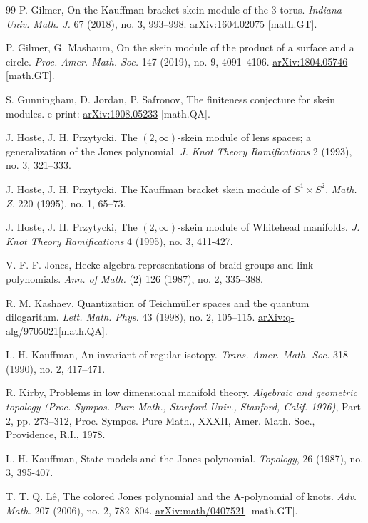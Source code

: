 \documentclass[12pt]{amsproc}
\begin{document}
\begin{thebibliography}{99}
P. Gilmer, On the Kauffman bracket skein module of the $3$-torus.
{\it Indiana Univ. Math. J.} 67 (2018), no. 3, 993–998. \href{https://arxiv.org/abs/1604.02075} {arXiv:1604.02075} [math.GT].

P. Gilmer, G. Masbaum, 
On the skein module of the product of a surface and a circle. {\it Proc. Amer. Math. Soc.} 147 (2019), no. 9, 4091–4106. \href{https://arxiv.org/abs/1804.05746} {arXiv:1804.05746} [math.GT].

S. Gunningham, D. Jordan, P. Safronov, The finiteness conjecture for skein modules. e-print: \href{https://arxiv.org/abs/1908.05233}{arXiv:1908.05233} [math.QA].

J. Hoste, J. H. Przytycki,  The $(2,\infty)$-skein module of lens spaces; a generalization of the Jones polynomial. {\it J. Knot Theory Ramifications} 2 (1993), no. 3, 321–333.

J. Hoste, J. H. Przytycki, The Kauffman bracket skein module of $S^1 \times S^2$. {\it Math. Z.} 220 (1995), no. 1, 65–73.

J. Hoste, J. H. Przytycki,
The $(2,\infty)$-skein module of Whitehead manifolds. 
{\it J. Knot Theory Ramifications} 4 (1995), no. 3, 411-427.

V. F. F. Jones,
Hecke algebra representations of braid groups and link polynomials. 
{\it Ann. of Math.} (2) 126 (1987), no. 2, 335–388.

R. M. Kashaev, 
Quantization of Teichmüller spaces and the quantum dilogarithm.
{\it Lett. Math. Phys.} 43 (1998), no. 2, 105–115. \href{https://arxiv.org/abs/q-alg/9705021}{arXiv:q-alg/9705021}[math.QA].

L. H. Kauffman,
An invariant of regular isotopy. 
{\it Trans. Amer. Math. Soc.} 318 (1990), no. 2, 417–471.


R. Kirby, Problems in low dimensional manifold theory. {\it Algebraic and geometric topology (Proc. Sympos. Pure Math., Stanford Univ., Stanford, Calif. 1976)}, Part 2, pp. 273–312, 
Proc. Sympos. Pure Math., XXXII, Amer. Math. Soc., Providence, R.I., 1978.


L. H. Kauffman, State models and the Jones polynomial. {\it Topology}, 26 (1987), no. 3, 395-407.

T. T. Q. Lê, The colored Jones polynomial and the A-polynomial of knots. {\it Adv. Math.} 207 (2006), no. 2, 782–804. \href{https://arxiv.org/abs/math/0407521}{arXiv:math/0407521} [math.GT].


\end{thebibliography}
\end{document}
